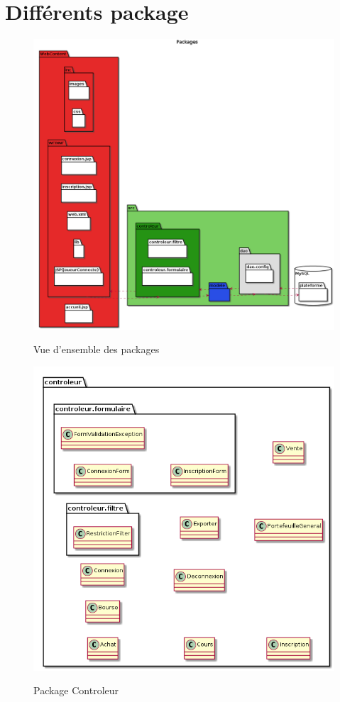\section{Différents package}

\begin{figure}[H]
  \center
  \includegraphics[scale=0.25]{../graph/packages.png} \\
  \caption{Vue d'ensemble des packages}
\end{figure}

\begin{figure}[H]
  \center
  \includegraphics[scale=0.25]{../graph/packageControleur.png} \\
  \caption{Package Controleur}
\end{figure}

